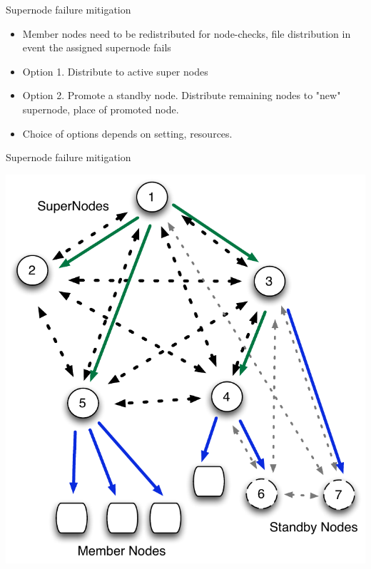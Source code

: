 \documentclass{beamer}
\begin{document}
\begin{frame}{Supernode failure mitigation}

\begin{itemize}
\item
Member nodes need to be redistributed for node-checks, file distribution in event the assigned supernode fails

\item
Option 1.  Distribute to active super nodes
\item
Option 2.  Promote a standby node.  Distribute remaining nodes to "new" supernode, place of promoted node.
\item
Choice of options depends on setting, resources.  
\end{itemize}



\end{frame}

\begin{frame}{Supernode failure mitigation}

\includegraphics[scale=.5]{Node-comm-v3.pdf}


\end{frame}
\end{document}
